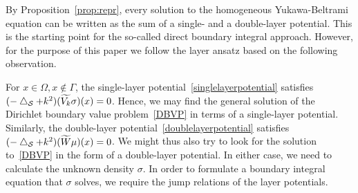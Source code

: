 By Proposition~\ref{prop:repr}, every solution to the homogeneous
Yukawa-Beltrami equation can be written as the sum of a single- and a
double-layer potential.  This  is the starting point for the so-called
direct boundary integral approach. However, for the purpose of this
paper we follow the layer ansatz based on the following observation.

For $x \in \Omega, x \notin \Gamma$, the single-layer
potential~\eqref{singlelayerpotential} satisfies $(-\bigtriangleup_{\mathcal{S}} + k^{2})
(\widetilde{V_k}\sigma)(x)=0$.  Hence, we may find the general solution
of the Dirichlet boundary value problem~\eqref{DBVP} in terms of a
single-layer potential.  Similarly, the double-layer
potential~\eqref{doublelayerpotential} satisfies $(-\bigtriangleup_{\mathcal{S}} +
k^2)(\widetilde{W}\mu)(x)=0$.  We might thus also try to look for the
solution to~\eqref{DBVP} in the form of a double-layer potential.  In
either case, we need to calculate the unknown density $\sigma$.  In
order to formulate a boundary integral equation that $\sigma$ solves,
we require the jump relations of the layer potentials.




